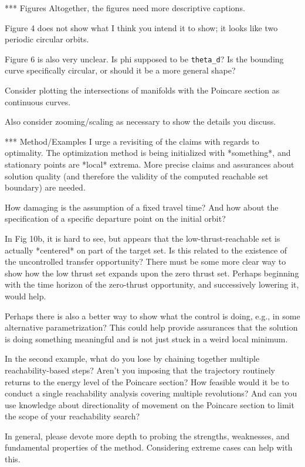 \documentclass[11pt]{article}
\begin{document}
*** Figures
Altogether, the figures need more descriptive captions.  

Figure 4 does not show what I think you intend it to show; it looks like two periodic circular orbits.

Figure 6 is also very unclear.  Is phi supposed to be \texttt{theta\_d}?  Is the bounding curve specifically circular, or should it be a more general shape?

Consider plotting the intersections of manifolds with the Poincare section as continuous curves.  

Also consider zooming/scaling as necessary to show the details you discuss.

*** Method/Examples
I urge a revisiting of the claims with regards to optimality.  The optimization method is being initialized with *something*, and stationary points are *local* extrema.  More precise claims and assurances about solution quality (and therefore the validity of the computed reachable set boundary) are needed.  

How damaging is the assumption of a fixed travel time?  And how about the specification of a specific departure point on the initial orbit?

In Fig 10b, it is hard to see, but appears that the low-thrust-reachable set is actually *centered* on part of the target set.  Is this related to the existence of the uncontrolled transfer opportunity?  There must be some more clear way to show how the low thrust set expands upon the zero thrust set.  Perhaps beginning with the time horizon of the zero-thrust opportunity, and successively lowering it, would help.  

Perhaps there is also a better way to show what the control is doing, e.g., in some alternative parametrization?  This could help provide assurances that the solution is doing something meaningful and is not just stuck in a weird local minimum.  

In the second example, what do you lose by chaining together multiple reachability-based steps?  Aren't you imposing that the trajectory routinely returns to the energy level of the Poincare section? How feasible would it be to conduct a single reachability analysis covering multiple revolutions? And can you use knowledge about directionality of movement on the Poincare section to limit the scope of your reachability search?

In general, please devote more depth to probing the strengths, weaknesses, and fundamental properties of the method.  Considering extreme cases can help with this.



\end{document}
